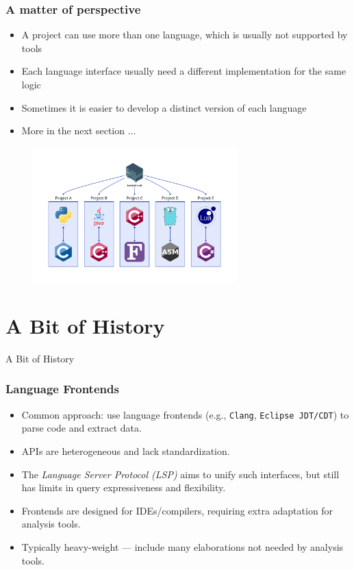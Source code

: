 \documentclass[dvipsnames, 10pt]{beamer}
\begin{document}
\begin{frame}
  \frametitle{A matter of perspective}
  \begin{itemize}
    \item A project can use more than one language, which is usually not supported by tools
    \item Each language interface usually need a different implementation for the same logic
    \item Sometimes it is easier to develop a distinct version of each language
    \item More in the next section ...
  \end{itemize}
  \begin{figure}
    \begin{center}
      \includegraphics[width=0.7\textwidth]{figures/githut/problem-multi-languages.png}
    \end{center}
  \end{figure}
\end{frame}

\section{A Bit of History}
\begin{frame}
  \centering
  \Huge
  A Bit of History
\end{frame}

\begin{frame}
  \frametitle{Language Frontends}
  \begin{itemize}
    \item Common approach: use language frontends (e.g., \texttt{Clang}, \texttt{Eclipse JDT/CDT}) to parse code and extract data.
    \item APIs are heterogeneous and lack standardization.
    \item The \textit{Language Server Protocol (LSP)} aims to unify such interfaces, but still has limits in query expressiveness and flexibility.
    \item Frontends are designed for IDEs/compilers, requiring extra adaptation for analysis tools.
    \item Typically heavy-weight — include many elaborations not needed by analysis tools.
  \end{itemize}
\end{frame}
\end{document}
